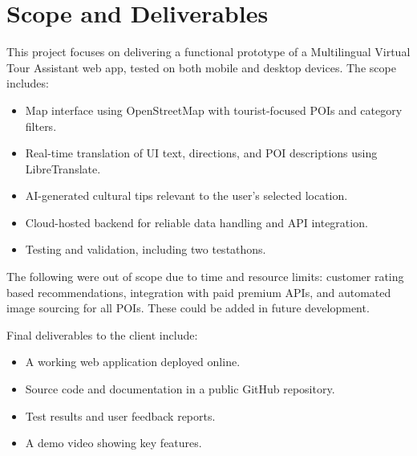 \section{Scope and Deliverables}
This project focuses on delivering a functional prototype of a Multilingual Virtual Tour Assistant web app, tested on both mobile and desktop devices. The scope includes:
\begin{itemize}
\item Map interface using OpenStreetMap with tourist-focused POIs and category filters.
\item Real-time translation of UI text, directions, and POI descriptions using LibreTranslate.
\item AI-generated cultural tips relevant to the user’s selected location.
\item Cloud-hosted backend for reliable data handling and API integration.
\item Testing and validation, including two testathons.
\end{itemize}

The following were out of scope due to time and resource limits: customer rating based recommendations, integration with paid premium APIs, and automated image sourcing for all POIs. These could be added in future development.

Final deliverables to the client include:
\begin{itemize}
\item A working web application deployed online.
\item Source code and documentation in a public GitHub repository.
\item Test results and user feedback reports.
\item A demo video showing key features.
\end{itemize}